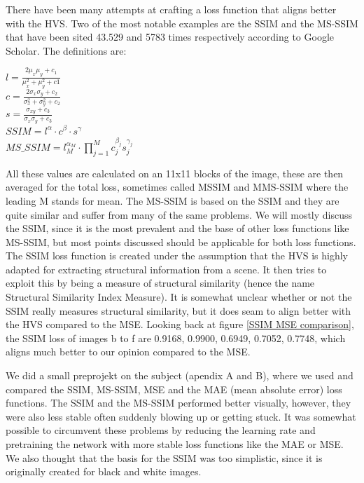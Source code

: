 There have been many attempts at crafting a loss function that aligns better with the HVS. Two of the most notable examples are the SSIM\cite{SSIM} and the MS-SSIM\cite{MSSSIM}\cite{benchmark} that have been sited 43.529 and 5783 times respectively according to Google Scholar. The definitions are:
\begin{center}
    $l = \frac{2\mu_x\mu_y+c_1}{\mu_x^2+\mu_y^2+c1}$ \\
    $c = \frac{2\sigma_x\sigma_y+c_2}{\sigma_x^2 + \sigma_y^2 + c_2}$\\
    $s = \frac{\sigma_{xy} + c_3}{\sigma_x\sigma_y + c_3}$\\
    $SSIM = l^\alpha \cdot c^{\beta} \cdot s^\gamma $\\
    $MS\_SSIM = l_M ^ {\alpha_M} \cdot \prod_{j=1}^M c_j^{\beta_j} s_j^{\gamma_j}$
\end{center}

All these values are calculated on an 11x11 blocks of the image, these are then averaged for the total loss, sometimes called MSSIM and MMS-SSIM where the leading M stands for mean\cite{SSIM}\cite{MSSSIM}.
The MS-SSIM is based on the SSIM and they are quite similar and suffer from many of the same problems. We will mostly discuss the SSIM, since it is the most prevalent and the base of other loss functions like MS-SSIM, but most points discussed should be applicable for both loss functions\cite{ssimbad}\cite{MSSSIM}. The SSIM loss function is created under the assumption that the HVS is highly adapted for extracting structural information from a scene\cite{SSIM}. It then tries to exploit this by being a measure of structural similarity (hence the name Structural Similarity Index Measure). It is somewhat unclear whether or not the SSIM really measures structural similarity\cite{ssimbad}, but it does seam to align better with the HVS compared to the MSE. Looking back at figure \ref{SSIM MSE comparison}, the SSIM loss of images b to f are 0.9168, 0.9900, 0.6949, 0.7052, 0.7748, which aligns much better to our opinion compared to the MSE.

We did a small preprojekt on the subject (apendix A and B), where we used and compared the SSIM, MS-SSIM, MSE and the MAE (mean absolute error) loss functions. The SSIM and the MS-SSIM performed better visually, however, they were also less stable often suddenly blowing up or getting stuck. It was somewhat possible to circumvent these problems by reducing the learning rate and pretraining the network with more stable loss functions like the MAE or MSE. We also thought that the basis for the SSIM was too simplistic, since it is originally created for black and white images\cite{SSIM}\cite{MSSSIM}.

